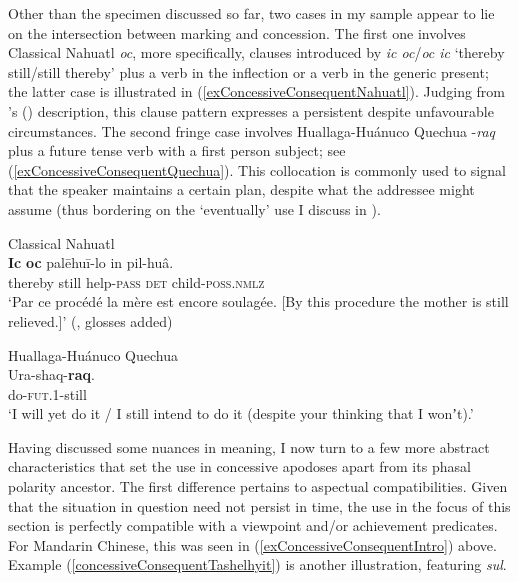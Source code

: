 Other than the specimen discussed so far, two cases in my sample appear to lie on the intersection between marking  and concession. The first one involves Classical Nahuatl \textit{oc}, more specifically, clauses introduced by \textit{ic oc}/\textit{oc ic} \lq thereby still/still thereby\rq{} plus a verb in the   inflection or a verb in the generic present; the latter case is illustrated in (\ref{exConcessiveConsequentNahuatl}). Judging from \citeauthor{Launey1986}'s (\citeyear[1264]{Launey1986}) description, this clause pattern expresses a persistent  despite unfavourable circumstances. 
The second fringe case involves Huallaga-Huánuco Quechua \mbox{-\textit{raq}} plus a future tense verb with a first person subject; see (\ref{exConcessiveConsequentQuechua}). This collocation is commonly used to signal that the speaker maintains a certain plan, despite what the addressee might assume  (thus bordering on the  \lq eventually\rq{ }use I discuss in ). 

\begin{exe}
	\ex Classical Nahuatl\label{exConcessiveConsequentNahuatl}\\
	\gll \textbf{Ic} \textbf{oc} palēhuī-lo in pil-huâ.\\
	thereby still help-\textsc{pass} \textsc{det} child-\textsc{poss}.\textsc{nmlz}\\
	\glt \lq Par ce procédé la mère est encore soulagée. [By this procedure the mother is still relieved.]' (\cite[1265]{Launey1986}, glosses added)
 
	\ex Huallaga-Huánuco Quechua\label{exConcessiveConsequentQuechua}\\
	\gll Ura-shaq-\textbf{raq}.\\
	do-\textsc{fut}.1-still\\
	\glt \lq I will yet do it / I still intend to do it (despite your thinking that I wonʼt).' \parencite[389]{Weber1989}
\end{exe}

 Having discussed some nuances in meaning, I now turn to a few more abstract characteristics that set the use in concessive apodoses apart from its phasal polarity ancestor. The first difference pertains to aspectual compatibilities. Given that the situation in question need not persist in time, the use in the focus of this section is perfectly compatible with a  viewpoint and/or achievement predicates. For Mandarin Chinese, this was seen in  (\ref{exConcessiveConsequentIntro}) above. Example (\ref{concessiveConsequentTashelhyit}) is another illustration, featuring  \textit{sul}.

